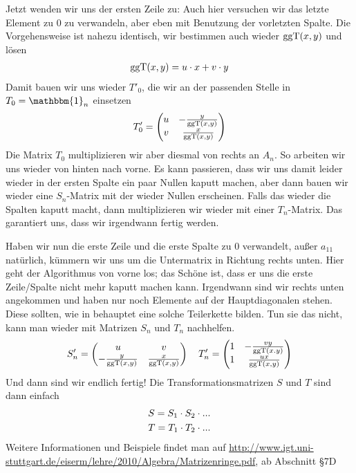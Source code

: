 \begin{*anmerkung}[Teil 2]
	Jetzt wenden wir uns der ersten Zeile zu: Auch hier versuchen wir das letzte Element zu 0 zu verwandeln, aber eben mit Benutzung der vorletzten Spalte. Die Vorgehensweise ist nahezu identisch, wir bestimmen auch wieder $\operatorname{ggT}(x,y)$ und lösen
	\begin{align}
		\operatorname{ggT}(x,y)=u\cdot x + v\cdot y\notag
	\end{align}
	Damit bauen wir uns wieder $T'_0$, die wir an der passenden Stelle in $T_0=\mathbbm{1}_n$ einsetzen
	\begin{align}
		T'_0=\begin{pmatrix}u & -\frac{y}{\operatorname{ggT}(x,y)} \\ v & \frac{x}{\operatorname{ggT}(x,y)}\end{pmatrix}\notag
	\end{align}
	Die Matrix $T_0$ multiplizieren wir aber diesmal von rechts an $A_n$. So arbeiten wir uns wieder von hinten nach vorne. Es kann passieren, dass wir uns damit leider wieder in der ersten Spalte ein paar Nullen kaputt machen, aber dann bauen wir wieder eine $S_n$-Matrix mit der wieder Nullen erscheinen. Falls das wieder die Spalten kaputt macht, dann multiplizieren wir wieder mit einer $T_n$-Matrix. Das  garantiert uns, dass wir irgendwann fertig werden.
	
	Haben wir nun die erste Zeile und die erste Spalte zu 0 verwandelt, außer $a_{11}$ natürlich, kümmern wir uns um die Untermatrix in Richtung rechts unten. Hier geht der Algorithmus von vorne los; das Schöne ist, dass er uns die erste Zeile/Spalte nicht mehr kaputt machen kann. Irgendwann sind wir rechts unten angekommen und haben nur noch Elemente auf der Hauptdiagonalen stehen. Diese sollten, wie in  behauptet eine solche Teilerkette bilden. Tun sie das nicht, kann man wieder mit Matrizen $S_n$ und $T_n$ nachhelfen.
	\begin{align}
		S'_n=\begin{pmatrix}u & v \\ -\frac{y}{\operatorname{ggT}(x,y)} & \frac{x}{\operatorname{ggT}(x,y)}\end{pmatrix}\quad 
		T'_n=\begin{pmatrix}1 & -\frac{vy}{\operatorname{ggT}(x.y)} \\ 1 & \frac{ux}{\operatorname{ggT}(x,y)}\end{pmatrix} \notag
	\end{align}
	Und dann sind wir endlich fertig! Die Transformationsmatrizen $S$ und $T$ sind dann einfach
	\begin{align}
		S = S_1\cdot S_2\cdot ... \notag \\
		T = T_1\cdot T_2\cdot ... \notag
	\end{align}
	Weitere Informationen und Beispiele findet man auf \url{http://www.igt.uni-stuttgart.de/eiserm/lehre/2010/Algebra/Matrizenringe.pdf}, ab Abschnitt §7D
\end{*anmerkung}
